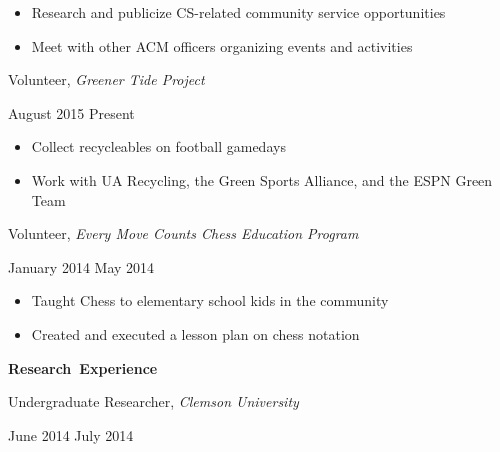 \documentclass[11pt]{article}
\begin{document}
\begin{itemize}
  \item Research and publicize CS-related community service opportunities
  \item Meet with other ACM officers organizing events and activities
\end{itemize}

\vspace{0.4em}
\begin{minipage}[t]{0.7\textwidth}
\flushleft
Volunteer, \textit{Greener Tide Project}\\
\end{minipage}
\begin{minipage}[t]{0.25\textwidth}
\flushright
August 2015 \space \textemdash \space Present\\
\end{minipage}

\begin{itemize}
  \item Collect recycleables on football gamedays
  \item Work with UA Recycling, the Green Sports Alliance, and the ESPN Green Team
\end{itemize}

\vspace{0.4em}
\begin{minipage}[t]{0.7\textwidth}
\flushleft
Volunteer, \textit{Every Move Counts Chess Education Program}\\
\end{minipage}
\begin{minipage}[t]{0.25\textwidth}
\flushright
January 2014 \space \textemdash \space May 2014\\
\end{minipage}

\begin{itemize}
  \item Taught Chess to elementary school kids in the community
  \item Created and executed a lesson plan on chess notation
\end{itemize}

\vspace{0.8em}
\hbox{\large \textbf{Research Experience}}

\begin{minipage}[t]{0.7\textwidth}
\flushleft
Undergraduate Researcher, \textit{Clemson University}\\
\end{minipage}
\begin{minipage}[t]{0.25\textwidth}
\flushright
June 2014 \space \textemdash \space July 2014\\
\end{minipage}
\end{document}
